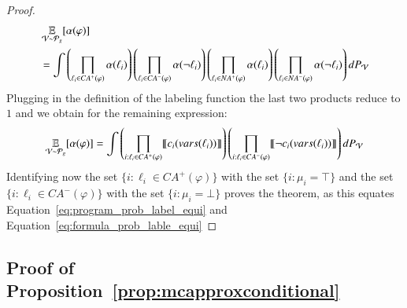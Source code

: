 \begin{proof}
    \begin{align}
         & \operatorname*{\mathbb{E}}_{\mathcal{V} \sim  \mathcal{P}_g} [\alpha( \varphi )] \\
         & =
        \int
        \left( \prod_{\ell_i \in CA^+(\varphi)} \alpha (  \ell_i ) \right)
        \left( \prod_{\ell_i \in CA^-(\varphi)} \alpha (  \neg \ell_i ) \right)
        \left( \prod_{\ell_i \in NA^+(\varphi)} \alpha (  \ell_i ) \right)
        \left( \prod_{\ell_i \in NA^-(\varphi)} \alpha (  \neg \ell_i ) \right)
        \nonumber
        \mathop{}\!{d}{P_\mathcal{V}}
    \end{align}
    Plugging in the definition of the labeling function the last two products reduce to $1$ and we obtain for the remaining expression:
    \begin{align}
        \operatorname*{\mathbb{E}}_{\mathcal{V} \sim  \mathcal{P}_g} [\alpha( \varphi )]
        =
        \int
        \left( \prod_{i: \ell_i \in CA^+(\varphi)} \llbracket  c_i(vars(\ell_i)) \rrbracket \right)
        \left( \prod_{i: \ell_i \in CA^-(\varphi)} \llbracket  \neg c_i(vars(\ell_i)) \rrbracket \right)
        \mathop{}\!{d}{P_\mathcal{V}}
        \label{eq:formula_prob_lable_equi}
    \end{align}
    Identifying now the set $\{ i: \ell_i \in CA^+(\varphi) \}$ with the set $\{i : \mu_i=\top   \} $ and the set  $\{ i: \ell_i \in CA^-(\varphi) \}$ with the set $\{i : \mu_i=\bot   \} $ proves the theorem, as this equates Equation~\ref{eq:program_prob_label_equi} and Equation~\ref{eq:formula_prob_lable_equi}
\end{proof}


\subsection{Proof of Proposition~\ref{prop:mcapproxconditional}}
\label{app:proof:mcapproxconditional}


\mcapproxconditional*

